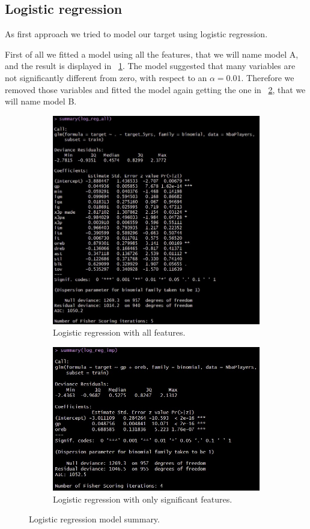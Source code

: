 \subsection{Logistic regression}

As first approach we tried to model our target using logistic regression.

First of all we fitted a model using all the features, that we will name model A, and the result is displayed in \Fig~\ref{fig:LRAllSum}. The model suggested that many variables are not significantly different from zero, with respect to an $\alpha = 0.01$. Therefore we removed those variables and fitted the model again getting the one in \Fig~\ref{fig:LRImpSum}, that we will name model B.

\begin{figure}[h]
	\begin{subfigure}{.6\textwidth}
		\centering
		\includegraphics[width=0.7\linewidth]{ImageFiles/Classification/LogReg/log_reg_tt_all_summary}
		\caption{Logistic regression with all features.}
		\label{fig:LRAllSum}
	\end{subfigure}
	\begin{subfigure}{.6\textwidth}
		\centering
		\includegraphics[width=0.8\linewidth]{ImageFiles/Classification/LogReg/log_reg_tt_imp_summary}
		\caption{Logistic regression with only significant features.}
		\label{fig:LRImpSum}
	\end{subfigure}
	\caption{Logistic regression model summary.}
	\label{fig:LRSum}
\end{figure}

